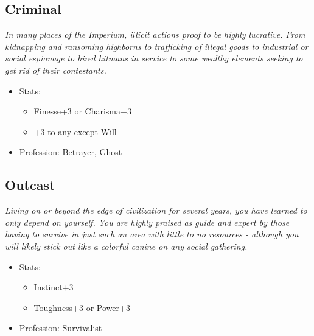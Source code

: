	\subsection{Criminal}
	\textit{In many places of the Imperium, illicit actions proof to be highly lucrative. From kidnapping and ransoming highborns to trafficking of illegal goods to industrial or social espionage to hired hitmans in service to some wealthy elements seeking to get rid of their contestants.}
	\begin{itemize}
		\item Stats:
		\begin{itemize}
			\item Finesse+3 or Charisma+3
			\item +3 to any except Will
		\end{itemize}
		\item Profession: Betrayer, Ghost
	\end{itemize}

	\subsection{Outcast}
	\textit{Living on or beyond the edge of civilization for several years, you have learned to only depend on yourself. You are highly praised as guide and expert by those having to survive in just such an area with little to no resources - although you will likely stick out like a colorful canine on any social gathering. }
	\begin{itemize}
		\item Stats:
		\begin{itemize}
			\item Instinct+3
			\item Toughness+3 or Power+3
		\end{itemize}
		\item Profession: Survivalist
	\end{itemize}

